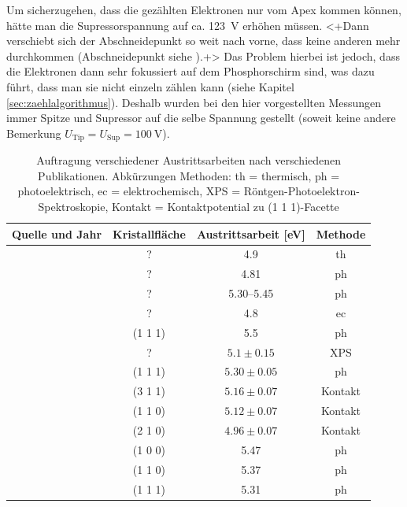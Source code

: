 \documentclass[bachelor,       %
               twoside,        %
               BCOR10mm,       %
               english,ngerman, %
               ]{GAUBM}
\begin{document}
Um sicherzugehen, dass die gezählten Elektronen nur vom Apex kommen können, hätte man die Supressorspannung auf ca. \SI{123}{\V} erhöhen müssen.
<+Dann verschiebt sich der Abschneidepunkt so weit nach vorne, dass keine anderen mehr durchkommen (Abschneidepunkt siehe \citet[S. 71 ff.]{bormann_2015}).+> 
Das Problem hierbei ist jedoch, dass die Elektronen dann sehr fokussiert auf dem Phosphorschirm sind, was dazu führt, dass man sie nicht einzeln zählen kann (siehe Kapitel \ref{sec:zaehlalgorithmus}).
Deshalb wurden bei den hier vorgestellten Messungen immer Spitze und Supressor auf die selbe Spannung gestellt (soweit keine andere Bemerkung $U_\text{Tip}=U_\text{Sup}=\SI{100}{\V}$).



\begin{table}[h!]
\centering
\begin{tabular}{|c|c|c|c|}
\hline 
Quelle und Jahr& Kristallfläche & Austrittsarbeit [\unit{eV}] & Methode \\ 
\hline\hline
\citet[1931]{fowler_1931} & ? 			& 4.9 				& th \\\hline
\citet[1932]{dubridge_further_1932} & ? 	& 4.81 			& ph \\\hline

\citet[1966]{sachtler_work_1966} & ? 	& \numrange{5.30}{5.45} & ph \\\hline

\citet[1974]{trasatti_operative_1974} & ? 	& 4.8 		& ec \\\hline
\citet[1982]{pescia_spin_1982} & (1 1 1) 	& 5.5 		& ph \\\hline
\citet[1986]{koetz_1986} & ? 				& $5.1\pm0.15$ 		& XPS \\\hline
\citet[1990]{lecoeur_1990}	& (1 1 1) 		& $5.30\pm0.05$ 	& ph \\
					& (3 1 1) 		& $5.16\pm0.07$ 	& Kontakt \\
					& (1 1 0) 		& $5.12\pm0.07$ 	& Kontakt \\
					& (2 1 0) 		& $4.96\pm0.07$ 	& Kontakt \\\hline
\citet[2004]{crc}		&(1 0 0) 			& 5.47 				& ph \\
 				&(1 1 0) 			& 5.37 				& ph \\
				&(1 1 1) 			& 5.31 				& ph \\\hline
\end{tabular} 
\caption{Auftragung verschiedener Austrittsarbeiten nach verschiedenen Publikationen. Abkürzungen Methoden: th = thermisch, ph = photoelektrisch, ec = elektrochemisch, XPS = Röntgen-Photoelektron-Spektroskopie, Kontakt = Kontaktpotential zu (1 1 1)-Facette\label{tab:austrittsarbeit}}
\end{table}
\end{document}

